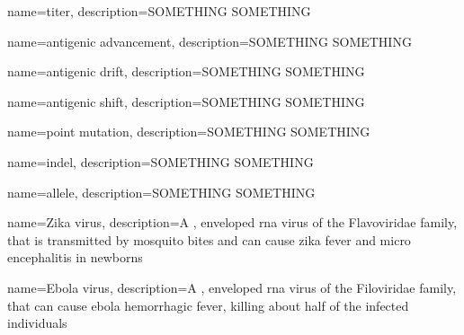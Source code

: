 {
    name=titer,
    description={SOMETHING SOMETHING}
}

{
    name=antigenic advancement,
    description={SOMETHING SOMETHING}
}

{
    name=antigenic drift,
    description={SOMETHING SOMETHING}
}

{
    name=antigenic shift,
    description={SOMETHING SOMETHING}
}

{
    name=point mutation,
    description={SOMETHING SOMETHING}
}

{
    name=indel,
    description={SOMETHING SOMETHING}
}

{
    name=allele,
    description={SOMETHING SOMETHING}
}

{
    name=Zika virus,
    description={A  , enveloped \acrshort{rna} virus of the Flavoviridae family, that is transmitted by mosquito bites and can cause zika fever and micro encephalitis in newborns}
}

{
    name=Ebola virus,
    description={A  , enveloped \acrshort{rna} virus of the Filoviridae family, that can cause ebola hemorrhagic fever, killing about half of the infected individuals}
}












